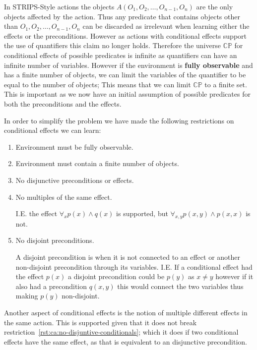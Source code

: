\documentclass[../Master.tex]{subfiles}
\begin{document}
In STRIPS-Style actions the objects $A(O_1,O_2,\ldots,O_{n-1},O_n)$ are the only objects affected by the action.
Thus any predicate that contains objects other than $O_1,O_2,\ldots,O_{n-1},O_n$ can be discarded as irrelevant when learning either the effects or the preconditions.
However as actions with conditional effects support the use of quantifiers this claim no longer holds.
Therefore the universe $\mathbb{CP}$ for conditional effects of possible predicates is infinite as quantifiers can have an infinite number of variables.
However if the environment is \textbf{fully observable} and has a finite number of objects,
we can limit the variables of the quantifier to be equal to the number of objects; This means that we can limit $\mathbb{CP}$ to a finite set.
This is important as we now have an initial assumption of possible predicates for both the preconditions and the effects.

In order to simplify the problem we have made the following restrictions on conditional effects we can learn:
\begin{enumerate}[label=R.\arabic*]
	\item Environment must be fully observable.
	\item Environment must contain a finite number of objects.
	\item \label{rst:ca:no-disjuntive-conditionals} No disjunctive preconditions or effects.
	\item \label{rst:ca:no-multiple-effect} No multiples of the same effect.

		  I.E. the effect $\forall_x p(x) \land q(x)$ is supported, but $\forall_{x, y} p(x, y) \land p(x, x) $ is not.

	\item \label{rst:ca:no-disjoint-preconditions} No disjoint preconditions.

		  A disjoint precondition is when it is not connected to an effect or another non-disjoint precondition through its variables.
		  I.E. If a conditional effect had the effect $p(x)$ a disjoint precondition could be $p(y)$ as $x \neq y$ however if it also had a precondition $q(x,y)$ this would connect the two variables thus making $p(y)$ non-disjoint.
\end{enumerate}

Another aspect of conditional effects is the notion of multiple different effects in the same action. This is supported given that it does not break restriction~\ref{rst:ca:no-disjuntive-conditionals}; which it does if two conditional effects have the same effect, as that is equivalent to an disjunctive precondition.
\end{document}
